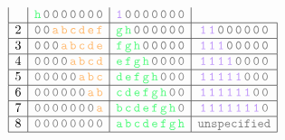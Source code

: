 \begin{figure}[!h]
\[\begin{array}{|c|c|c|c|}
        &\color{draculagreen} \texttt{h\,\lightGray{0\,0\,0\,0\,0\,0\,0}}
        &\color{draculapurple}{ \texttt{1\,}} \texttt{\lightGray{0\,0\,0\,0\,0\,0\,0}} \\
        \hline
        2
        &\yellowm{ \texttt{\lightGray{0\,0}\,a\,b\,c\,d\,e\,f}}
        &\color{draculagreen} \texttt{g\,h\,\lightGray{0\,0\,0\,0\,0\,0}}
        &\color{draculapurple}{ \texttt{1\,1\,}} \texttt{\lightGray{0\,0\,0\,0\,0\,0}} \\
        \hline
        3
        &\yellowm{ \texttt{\lightGray{0\,0\,0}\,a\,b\,c\,d\,e}}
        &\color{draculagreen} \texttt{f\,g\,h\,\lightGray{0\,0\,0\,0\,0}}
        &\color{draculapurple}{ \texttt{1\,1\,1\,}} \texttt{\lightGray{0\,0\,0\,0\,0}} \\
        \hline
        4
        &\yellowm{ \texttt{\lightGray{0\,0\,0\,0}\,a\,b\,c\,d}}
        &\color{draculagreen} \texttt{e\,f\,g\,h\,\lightGray{0\,0\,0\,0}}
        &\color{draculapurple}{ \texttt{1\,1\,1\,1\,}} \texttt{\lightGray{0\,0\,0\,0}} \\
        \hline
        5
        &\yellowm{\texttt{\lightGray{0\,0\,0\,0\,0}\,a\,b\,c}}
        &\color{draculagreen} \texttt{d\,e\,f\,g\,h\,\lightGray{0\,0\,0}}
        &\color{draculapurple}{ \texttt{1\,1\,1\,1\,1\,}} \texttt{\lightGray{0\,0\,0}} \\
        \hline
        6
        &\yellowm{\texttt{\lightGray{0\,0\,0\,0\,0\,0}\,a\,b}}
        &\color{draculagreen} \texttt{c\,d\,e\,f\,g\,h\,\lightGray{0\,0}}
        &\color{draculapurple}{ \texttt{1\,1\,1\,1\,1\,1\,}} \texttt{\lightGray{0\,0}} \\
        \hline
        7
        &\yellowm{\texttt{\lightGray{0\,0\,0\,0\,0\,0\,0}\,a}}
        &\color{draculagreen} \texttt{b\,c\,d\,e\,f\,g\,h\,\lightGray{0}}
        &\color{draculapurple}{ \texttt{1\,1\,1\,1\,1\,1\,1\,}} \texttt{\lightGray{0}}\\
        \hline
        8
        &\yellowm{\texttt{\lightGray{0\,0\,0\,0\,0\,0\,0\,0}}}
        &\color{draculagreen} \texttt{a\,b\,c\,d\,e\,f\,g\,h}
        & \texttt{\lightGray{unspecified}} \\
        \hline
    \end{array}
\]
\label{fig: split and shift bytes and ones}
\end{figure}
